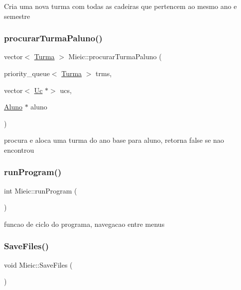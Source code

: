 Cria uma nova turma com todas as cadeiras que pertencem ao mesmo ano e semestre \hypertarget{class_mieic_aeaf54232a10821d3fe70d0c33e787d50}{}\label{class_mieic_aeaf54232a10821d3fe70d0c33e787d50} 
\subsubsection{\texorpdfstring{procurar\+Turma\+Paluno()}{procurarTurmaPaluno()}}
{\footnotesize\ttfamily vector$<$ \hyperlink{class_turma}{Turma} $>$ Mieic\+::procurar\+Turma\+Paluno (\begin{DoxyParamCaption}\item[{priority\+\_\+queue$<$ \hyperlink{class_turma}{Turma} $>$}]{trms,  }\item[{vector$<$ \hyperlink{class_uc}{Uc} $\ast$$>$}]{ucs,  }\item[{\hyperlink{class_aluno}{Aluno} $\ast$}]{aluno }\end{DoxyParamCaption})}

procura e aloca uma turma do ano base para aluno, retorna false se nao encontrou \hypertarget{class_mieic_a0aed4ed8f9ba31122b083f018954fdf7}{}\label{class_mieic_a0aed4ed8f9ba31122b083f018954fdf7} 
\subsubsection{\texorpdfstring{run\+Program()}{runProgram()}}
{\footnotesize\ttfamily int Mieic\+::run\+Program (\begin{DoxyParamCaption}{ }\end{DoxyParamCaption})}

funcao de ciclo do programa, navegacao entre menus \hypertarget{class_mieic_aa6eb7c4c3f8931e684948bf5af492257}{}\label{class_mieic_aa6eb7c4c3f8931e684948bf5af492257} 
\subsubsection{\texorpdfstring{Save\+Files()}{SaveFiles()}}
{\footnotesize\ttfamily void Mieic\+::\+Save\+Files (\begin{DoxyParamCaption}{ }\end{DoxyParamCaption})}

